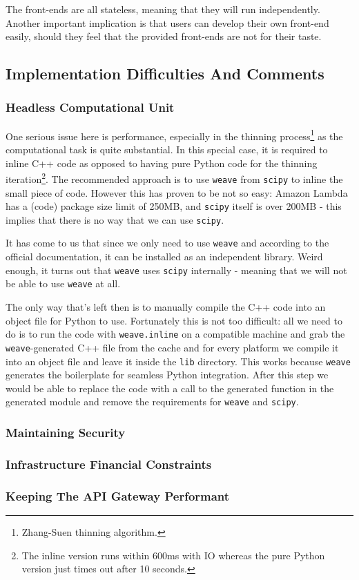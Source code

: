 The front-ends are all stateless, meaning that they will run independently. Another important implication is that users can develop their own front-end easily, should they feel that the provided front-ends are not for their taste.

\subsection{Implementation Difficulties And Comments}


\subsubsection{Headless Computational Unit}

One serious issue here is performance, especially in the thinning process\footnote{Zhang-Suen thinning algorithm.} as the computational task is quite substantial. In this special case, it is required to inline C++ code as opposed to having pure Python code for the thinning iteration\footnote{The inline version runs within 600ms with IO whereas the pure Python version just times out after 10 seconds.}. The recommended approach is to use \texttt{weave} from \texttt{scipy} to inline the small piece of code. However this has proven to be not so easy: Amazon Lambda has a (code) package size limit of 250MB, and \texttt{scipy} itself is over 200MB - this implies that there is no way that we can use \texttt{scipy}.

It has come to us that since we only need to use \texttt{weave} and according to the official documentation, it can be installed as an independent library. Weird enough, it turns out that \texttt{weave} uses \texttt{scipy} internally - meaning that we will not be able to use \texttt{weave} at all.

The only way that's left then is to manually compile the C++ code into an object file for Python to use. Fortunately this is not too difficult: all we need to do is to run the code with \texttt{weave.inline} on a compatible machine and grab the \texttt{weave}-generated C++ file from the cache and for every platform we compile it into an object file and leave it inside the \texttt{lib} directory. This works because \texttt{weave} generates the boilerplate for seamless Python integration. After this step we would be able to replace the code with a call to the generated function in the generated module and remove the requirements for \texttt{weave} and \texttt{scipy}.

\subsubsection{Maintaining Security}


\subsubsection{Infrastructure Financial Constraints}


\subsubsection{Keeping The API Gateway Performant} 

